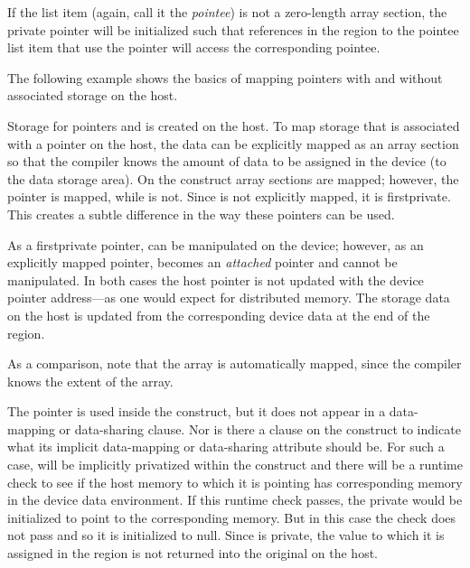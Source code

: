 If the list item (again, call it the \emph{pointee}) is not a zero-length array section, the private pointer will be initialized such that references in the  region to the pointee list item that use the pointer will access the corresponding pointee.

The following example shows the basics of mapping pointers with and without
associated storage on the host.

Storage for pointers  and  is created on the host. 
To map storage that is associated with a pointer on the host, the data can be
explicitly mapped as an array section so that the compiler knows 
the amount of data to be assigned in the device (to the  data storage area).
On the  construct array sections are mapped; however, the pointer 
is mapped, while  is not. Since  is not explicitly mapped, it is
firstprivate.  This creates a subtle difference in the way these pointers can be used.

As a firstprivate pointer,  can be manipulated on the device;
however, as an explicitly mapped pointer, 
 becomes an \emph{attached} pointer and cannot be manipulated.
In both cases the host pointer is not updated with the device pointer 
address---as one would expect for distributed memory. 
The storage data on the host is updated from the corresponding device
data at the end of the  region.

As a comparison, note that the  array is automatically mapped, 
since the compiler knows the extent of the array. 

The pointer  is used inside the  construct, but it does
not appear in a data-mapping or data-sharing clause. Nor is there a
 clause on the construct to indicate what its implicit
data-mapping or data-sharing attribute should be. For such a case, 
will be implicitly privatized within the construct and there will be a runtime
check to see if the host memory to which it is pointing has corresponding memory
in the device data environment. If this runtime check passes, the private
 would be initialized to point to the corresponding memory. But in
this case the check does not pass and so it is initialized to null.
Since  is private, the value to which it is assigned in the
 region is not returned into the original  on the host.

